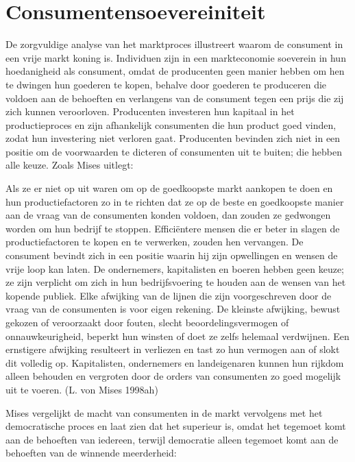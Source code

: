 \documentclass[
  a5paper,
  smalldemyvopaper,11pt,twoside,onecolumn,openright,extrafontsizes,
hidelinks]{memoir}
\begin{document}
\section{Consumentensoevereiniteit}\label{consumentensoevereiniteit}

De zorgvuldige analyse van het marktproces illustreert waarom de
consument in een vrije markt koning is. Individuen zijn in een
markteconomie soeverein in hun hoedanigheid als consument, omdat de
producenten geen manier hebben om hen te dwingen hun goederen te kopen,
behalve door goederen te produceren die voldoen aan de behoeften en
verlangens van de consument tegen een prijs die zij zich kunnen
veroorloven. Producenten investeren hun kapitaal in het productieproces
en zijn afhankelijk consumenten die hun product goed vinden, zodat hun
investering niet verloren gaat. Producenten bevinden zich niet in een
positie om de voorwaarden te dicteren of consumenten uit te buiten; die
hebben alle keuze. Zoals Mises uitlegt:

Als ze er niet op uit waren om op de goedkoopste markt aankopen te doen
en hun productiefactoren zo in te richten dat ze op de beste en
goedkoopste manier aan de vraag van de consumenten konden voldoen, dan
zouden ze gedwongen worden om hun bedrijf te stoppen. Efficiëntere
mensen die er beter in slagen de productiefactoren te kopen en te
verwerken, zouden hen vervangen. De consument bevindt zich in een
positie waarin hij zijn opwellingen en wensen de vrije loop kan laten.
De ondernemers, kapitalisten en boeren hebben geen keuze; ze zijn
verplicht om zich in hun bedrijfsvoering te houden aan de wensen van het
kopende publiek. Elke afwijking van de lijnen die zijn voorgeschreven
door de vraag van de consumenten is voor eigen rekening. De kleinste
afwijking, bewust gekozen of veroorzaakt door fouten, slecht
beoordelingsvermogen of onnauwkeurigheid, beperkt hun winsten of doet ze
zelfs helemaal verdwijnen. Een ernstigere afwijking resulteert in
verliezen en tast zo hun vermogen aan of slokt dit volledig op.
Kapitalisten, ondernemers en landeigenaren kunnen hun rijkdom alleen
behouden en vergroten door de orders van consumenten zo goed mogelijk
uit te voeren. (L. von Mises 1998ah)

Mises vergelijkt de macht van consumenten in de markt vervolgens met het
democratische proces en laat zien dat het superieur is, omdat het
tegemoet komt aan de behoeften van iedereen, terwijl democratie alleen
tegemoet komt aan de behoeften van de winnende meerderheid:
\end{document}
